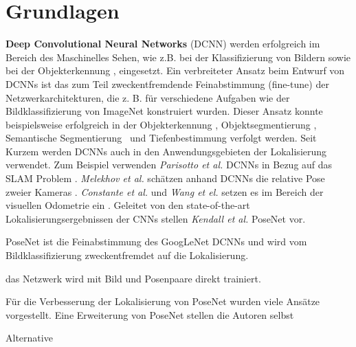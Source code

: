 \pagebreak
\section{Grundlagen}




\pagebreak
\textbf{Deep Convolutional Neural Networks} (DCNN) werden erfolgreich im Bereich des Maschinelles Sehen, wie z.B. bei der Klassifizierung von Bildern \cite{krizhevskyImageNetClassificationDeep2012, simonyanVeryDeepConvolutional2014, heDeepResidualLearning2015} sowie bei der  Objekterkennung \cite{girshickRichFeatureHierarchies2013, renFasterRCNNRealTime2015b, girshickFastRCNN2015},  eingesetzt. 
Ein verbreiteter Ansatz beim Entwurf von DCNNs ist das zum Teil zweckentfremdende Feinabstimmung (fine-tune) der Netzwerkarchitekturen, die z. B. für verschiedene Aufgaben wie der Bildklassifizierung von ImageNet \cite{russakovskyImageNetLargeScale2014} konstruiert wurden. Dieser Ansatz konnte beispielsweise erfolgreich in der Objekterkennung \cite{girshickFastRCNN2015}, Objektsegmentierung \cite{kokkinosPushingBoundariesBoundary2015, maninisConvolutionalOrientedBoundaries2016}, Semantische Segmentierung \cite{nohLearningDeconvolutionNetwork2015, hazirbasFuseNetIncorporatingDepth2017a} und Tiefenbestimmung \cite{liDepthSurfaceNormal2015} verfolgt werden.
Seit Kurzem werden DCNNs auch in den Anwendungsgebieten der Lokalisierung verwendet. Zum Beispiel verwenden \textit{Parisotto et al.} DCNNs in Bezug auf das SLAM Problem \cite{parisottoGlobalPoseEstimation2018}. \textit{Melekhov et al.} schätzen anhand DCNNs die relative Pose zweier Kameras \cite{melekwashovRelativeCameraPose2017}. \textit{Constante et al.} und \textit{Wang et el.} setzen es im Bereich der visuellen Odometrie ein \cite{costanteExploringRepresentationLearning2016, wangDeepVOEndtoendVisual2017}.
Geleitet von den state-of-the-art Lokalisierungsergebnissen der CNNs stellen \textit{Kendall et al.} PoseNet \cite{kendallPoseNetConvolutionalNetwork2015} vor.

PoseNet ist die Feinabstimmung des GoogLeNet \cite{szegedyGoingDeeperConvolutions2015} DCNNs und wird vom Bildklassifizierung zweckentfremdet auf die Lokalisierung.

das Netzwerk wird mit Bild und Posenpaare direkt trainiert.

Für die Verbesserung der Lokalisierung von PoseNet wurden viele Ansätze vorgestellt. Eine Erweiterung von PoseNet stellen die Autoren selbst


Alternative 





% 
